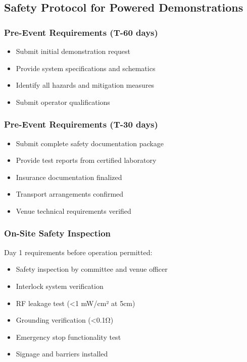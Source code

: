 \subsection{Safety Protocol for Powered Demonstrations}

\subsubsection{Pre-Event Requirements (T-60 days)}
\begin{itemize}[noitemsep]
    \item Submit initial demonstration request
    \item Provide system specifications and schematics
    \item Identify all hazards and mitigation measures
    \item Submit operator qualifications
\end{itemize}

\subsubsection{Pre-Event Requirements (T-30 days)}
\begin{itemize}[noitemsep]
    \item Submit complete safety documentation package
    \item Provide test reports from certified laboratory
    \item Insurance documentation finalized
    \item Transport arrangements confirmed
    \item Venue technical requirements verified
\end{itemize}

\subsubsection{On-Site Safety Inspection}
Day 1 requirements before operation permitted:
\begin{itemize}[noitemsep]
    \item Safety inspection by committee and venue officer
    \item Interlock system verification
    \item RF leakage test (<1 mW/cm² at 5cm)
    \item Grounding verification (<0.1Ω)
    \item Emergency stop functionality test
    \item Signage and barriers installed
\end{itemize}

